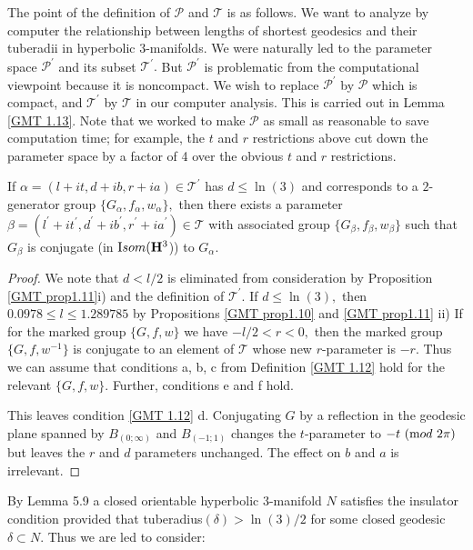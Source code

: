 The point of the definition of $\mathcal {P}$ and $\mathcal {T}$ is as follows.  We want to analyze by computer the relationship between lengths of shortest geodesics  and their tuberadii in hyperbolic $3$-manifolds.  We were naturally led to the parameter space 
$\mathcal {P}^{\prime}$ and its subset $\mathcal {T}^{\prime}.$  But 
$\mathcal {P}^{\prime}$ is problematic from the computational viewpoint because it is noncompact.  We wish to replace 
$\mathcal {P}^{\prime}$ by $\mathcal {P}$ which is compact, and 
$\mathcal {T}^{\prime}$ by $\mathcal {T}$ in our computer analysis.  This is carried out in Lemma \ref{GMT 1.13}.  Note that we worked to make $\mathcal {P}$ as small as reasonable to save computation time;  for example, the $t$ and $r$ restrictions above cut down the parameter space by a factor of 4 over the obvious $t$ and $r$ restrictions. 

\begin{lemma}\label{GMT 1.13}
If $\alpha=(l+it, d+ib, r+ia)\in \mathcal {T}^{\prime}$ has $d\le \ln(3)$ and
corresponds to a $2$\/{\textrm -}\/generator group
$\{G_\alpha,f_\alpha,w_\alpha\},$ then there exists a parameter $\beta=(l^{\prime}+it^{\prime}, d^{\prime}+ib^{\prime}, r^{\prime}+ia^{\prime})\in \mathcal {T}$ 
with associated group $\{G_\beta,f_\beta, w_\beta\}$ such that $G_\beta$ is conjugate (in ${\textrm Isom}(\mathbf {H}^3$)) to $G_\alpha.$ 
\end{lemma}

\begin{proof} We note that $d < l/2$ is eliminated from consideration by
Proposition \ref{GMT prop1.11}i)
and the definition of $\mathcal {T}^\prime.$ If $d\le \ln(3),$
then
$0.0978\le l\le 1.289785$ by
Propositions \ref{GMT prop1.10} and \ref{GMT prop1.11} ii)
If for the marked group $\{G, f, w\}$ we have 
$-l/2<r<0,$ then the marked group
$\{G,f,w^{-1}\}$ is conjugate to an element of $\mathcal {T}$ whose new
$r$-parameter is $-r.$  Thus we can assume that
conditions a, b, c from Definition \ref{GMT 1.12} hold for the relevant $\{G,f,w\}.$  Further,    conditions e and f hold.

This leaves condition \ref{GMT 1.12} d.  Conjugating $G$ by a
reflection in the geodesic plane spanned
by $B_{(0;\infty)}$ and $B_{(-1;1)}$ changes the $t$-parameter to 
$-t \ ({\textrm mod}\ 2\pi)$
but leaves the $r$ and $d$ parameters unchanged.
The effect on $b$ and $a$ is irrelevant.  \end{proof}

By \cite{G} Lemma 5.9
a closed orientable hyperbolic $3$-manifold $N$
satisfies the insulator condition provided that
tuberadius$(\delta) > \ln(3)/2$ for some closed geodesic $\delta\subset N.$  Thus we
are led to consider:

